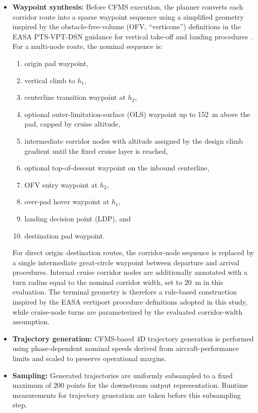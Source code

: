 \begin{itemize}
    \item \textbf{Waypoint synthesis:} Before CFMS execution, the planner converts each corridor route into a sparse waypoint sequence using a simplified geometry inspired by the obstacle-free-volume (OFV, ``verticone'') definitions in the EASA PTS-VPT-DSN guidance for vertical take-off and landing procedures~\cite{easa2022_pts_vpt_dsn}. For a multi-node route, the nominal sequence is:
    \begin{enumerate}
        \item origin pad waypoint,
        \item vertical climb to \(h_1\),
        \item centerline transition waypoint at \(h_2\),
        \item optional outer-limitation-surface (OLS) waypoint up to \SI{152}{m} above the pad, capped by cruise altitude,
        \item intermediate corridor nodes with altitude assigned by the design climb gradient until the fixed cruise layer is reached,
        \item optional top-of-descent waypoint on the inbound centerline,
        \item OFV entry waypoint at \(h_2\),
        \item over-pad hover waypoint at \(h_1\),
        \item landing decision point (LDP), and
        \item destination pad waypoint.
    \end{enumerate}
    For direct origin--destination routes, the corridor-node sequence is replaced by a single intermediate great-circle waypoint between departure and arrival procedures. Internal cruise corridor nodes are additionally annotated with a turn radius equal to the nominal corridor width, set to \SI{20}{m} in this evaluation. The terminal geometry is therefore a rule-based construction inspired by the EASA vertiport procedure definitions adopted in this study, while cruise-node turns are parameterized by the evaluated corridor-width assumption.

    \item \textbf{Trajectory generation:} CFMS-based 4D trajectory generation is performed using phase-dependent nominal speeds derived from aircraft-performance limits and scaled to preserve operational margins.

    \item \textbf{Sampling:} Generated trajectories are uniformly subsampled to a fixed maximum of 200 points for the downstream output representation. Runtime measurements for trajectory generation are taken before this subsampling step.
\end{itemize}

